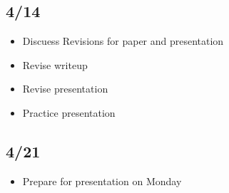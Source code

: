 \documentclass[12pt]{article}
\begin{document}
\subsection*{4/14}
\begin{itemize}
    \item Discuess Revisions for paper and presentation
    \item Revise writeup
    \item Revise presentation
    \item Practice presentation
\end{itemize}

\subsection*{4/21}
\begin{itemize}
    \item Prepare for presentation on Monday
\end{itemize}
\end{document}
